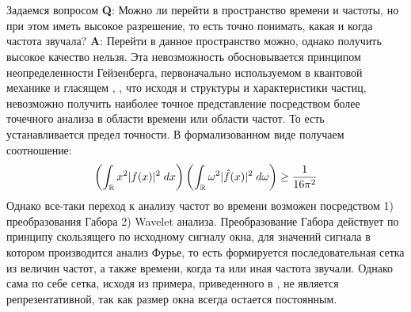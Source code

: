  \label{link::wavelet_analysis}
\\\\
\indent Задаемся вопросом \textbf{Q}: Можно ли перейти в пространство времени и частоты, но при этом иметь высокое разрешение, то есть точно понимать, какая и когда частота звучала? \textbf{A}: Перейти в данное пространство можно, однако получить высокое качество нельзя. Эта невозможность обосновывается принципом неопределенности Гейзенберга, первоначально используемом в квантовой механике и гласящем \cite{busch2007heisenberg}, \cite{brunton2022data}, что исходя и структуры и характеристики частиц, невозможно получить наиболее точное представление посредством более точечного анализа в области времени или области частот. То есть устанавливается предел точности. В формализованном виде получаем соотношение:
\begin{equation}
	\left(\int_{\mathbb{R}}x^2 |f(x)|^2 \; dx \right) \left(\int_{\mathbb{R}}\omega^2 |\hat{f}(x)|^2 \; d \omega \right) \ge \frac{1}{16 \pi^2}
\end{equation}
Однако все-таки переход к анализу частот во времени возможен посредством 1) преобразования Габора \cite{brunton2022data} 2) Wavelet анализа. Преобразование Габора действует по принципу скользящего по исходному сигналу окна, для значений сигнала в котором производится анализ Фурье, то есть формируется последовательная сетка из величин частот, а также времени, когда та или иная частота звучали. Однако сама по себе сетка, исходя из примера, приведенного в \cite{brunton2022data}, не является репрезентативной, так как размер окна всегда остается постоянным. 

